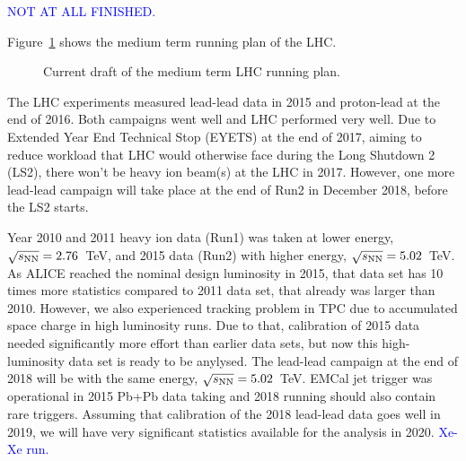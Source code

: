 \textcolor{blue}{NOT AT ALL FINISHED.}

Figure~\ref{fig:LHC-mid-term} shows the medium term running plan of the LHC. 
\begin{figure}[htbp]
   \centering
   \caption{Current draft of the medium term LHC running plan.}
   \label{fig:LHC-mid-term}
\end{figure}
The LHC experiments measured lead-lead data in 2015 and proton-lead at the end of 2016. Both campaigns went well and LHC performed very well. Due to Extended Year End Technical Stop (EYETS) at the end of 2017, aiming to reduce workload that LHC would otherwise face during the Long Shutdown 2 (LS2), there won't be heavy ion beam(s) at the LHC in 2017. However, one more lead-lead campaign will take place at the end of Run2 in December 2018, before the LS2 starts.

Year 2010 and 2011 heavy ion data (Run1) was taken at lower energy, $\sqrt{s_{\rm NN}}=2.76$~TeV, and 2015 data (Run2) with higher energy, $\sqrt{s_{\rm NN}}=5.02$~TeV. As ALICE reached the nominal design luminosity in 2015, that data set has 10 times more statistics compared to 2011 data set, that already was larger than 2010. However, we also experienced tracking problem in TPC due to accumulated space charge in high luminosity runs. Due to that, calibration of 2015 data needed significantly more effort than earlier data sets, but now this high-luminosity data set is ready to be anylysed. The lead-lead campaign at the end of 2018 will be with the same energy, $\sqrt{s_{\rm NN}}=5.02$~TeV. EMCal jet trigger was operational in 2015 Pb+Pb data taking and 2018 running should also contain rare triggers. Assuming that calibration of the 2018 lead-lead data goes well in 2019, we will have very significant statistics available for the analysis in 2020. \textcolor{blue}{Xe-Xe run.}

